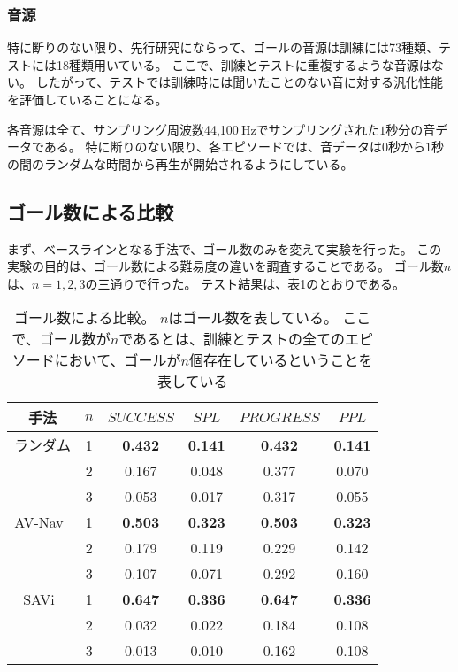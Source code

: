 \subsubsection{音源}
特に断りのない限り、先行研究\cite{chen2020soundspaces}にならって、ゴールの音源は訓練には73種類、テストには18種類用いている。
ここで、訓練とテストに重複するような音源はない。
したがって、テストでは訓練時には聞いたことのない音に対する汎化性能を評価していることになる。

各音源は全て、サンプリング周波数44,100$\ \mathrm{Hz}$でサンプリングされた$1$秒分の音データである。
特に断りのない限り、各エピソードでは、音データは$0$秒から$1$秒の間のランダムな時間から再生が開始されるようにしている。

\subsection{ゴール数による比較}

まず、ベースラインとなる手法で、ゴール数のみを変えて実験を行った。
この実験の目的は、ゴール数による難易度の違いを調査することである。
ゴール数$n$は、$n=1,2,3$の三通りで行った。
テスト結果は、表\ref{tab:n_goal_results}のとおりである。


\begin{table}[tb]
    \setlength{\tabcolsep}{4pt}
    \centering
    \caption{
        ゴール数による比較。
        $n$はゴール数を表している。
        ここで、ゴール数が$n$であるとは、訓練とテストの全てのエピソードにおいて、ゴールが$n$個存在しているということを表している
    }
    \label{tab:n_goal_results}
    \begin{tabular}{@{}cccccc@{}}
    \toprule
        手法 & $n$ & $SUCCESS$ & $SPL$ & $PROGRESS$ & $PPL$  \\ \midrule
        ランダム & 1 & \textbf{0.432} & \textbf{0.141} & \textbf{0.432} & \textbf{0.141} \\
        & 2 & 0.167 & 0.048 & 0.377 & 0.070 \\
        & 3 & 0.053 & 0.017 & 0.317 & 0.055 \\ \midrule
        AV-Nav~\cite{chen2020soundspaces} & 1 & \textbf{0.503} & \textbf{0.323} & \textbf{0.503} & \textbf{0.323} \\
        & 2 & 0.179 & 0.119 & 0.229 & 0.142 \\
        & 3 & 0.107 & 0.071 & 0.292 & 0.160 \\ \midrule
        SAVi~\cite{chen2021semantic} & 1 & \textbf{0.647} & \textbf{0.336} & \textbf{0.647} & \textbf{0.336} \\
        & 2 & 0.032 & 0.022 & 0.184 & 0.108 \\
        & 3 & 0.013 & 0.010 & 0.162 & 0.108 \\ \bottomrule
        \end{tabular}
\end{table}


